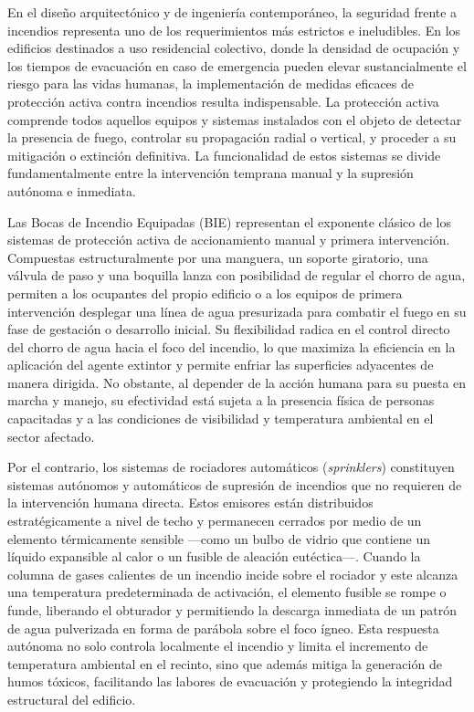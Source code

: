 \documentclass[12pt,a4paper]{article}
\begin{document}
En el diseño arquitectónico y de ingeniería contemporáneo, la seguridad frente a incendios representa uno de los requerimientos más estrictos e ineludibles. En los edificios destinados a uso residencial colectivo, donde la densidad de ocupación y los tiempos de evacuación en caso de emergencia pueden elevar sustancialmente el riesgo para las vidas humanas, la implementación de medidas eficaces de protección activa contra incendios resulta indispensable. La protección activa comprende todos aquellos equipos y sistemas instalados con el objeto de detectar la presencia de fuego, controlar su propagación radial o vertical, y proceder a su mitigación o extinción definitiva. La funcionalidad de estos sistemas se divide fundamentalmente entre la intervención temprana manual y la supresión autónoma e inmediata.

Las Bocas de Incendio Equipadas (BIE) representan el exponente clásico de los sistemas de protección activa de accionamiento manual y primera intervención. Compuestas estructuralmente por una manguera, un soporte giratorio, una válvula de paso y una boquilla lanza con posibilidad de regular el chorro de agua, permiten a los ocupantes del propio edificio o a los equipos de primera intervención desplegar una línea de agua presurizada para combatir el fuego en su fase de gestación o desarrollo inicial. Su flexibilidad radica en el control directo del chorro de agua hacia el foco del incendio, lo que maximiza la eficiencia en la aplicación del agente extintor y permite enfriar las superficies adyacentes de manera dirigida. No obstante, al depender de la acción humana para su puesta en marcha y manejo, su efectividad está sujeta a la presencia física de personas capacitadas y a las condiciones de visibilidad y temperatura ambiental en el sector afectado.

Por el contrario, los sistemas de rociadores automáticos (\textit{sprinklers}) constituyen sistemas autónomos y automáticos de supresión de incendios que no requieren de la intervención humana directa. Estos emisores están distribuidos estratégicamente a nivel de techo y permanecen cerrados por medio de un elemento térmicamente sensible ---como un bulbo de vidrio que contiene un líquido expansible al calor o un fusible de aleación eutéctica---. Cuando la columna de gases calientes de un incendio incide sobre el rociador y este alcanza una temperatura predeterminada de activación, el elemento fusible se rompe o funde, liberando el obturador y permitiendo la descarga inmediata de un patrón de agua pulverizada en forma de parábola sobre el foco ígneo. Esta respuesta autónoma no solo controla localmente el incendio y limita el incremento de temperatura ambiental en el recinto, sino que además mitiga la generación de humos tóxicos, facilitando las labores de evacuación y protegiendo la integridad estructural del edificio.
\end{document}
